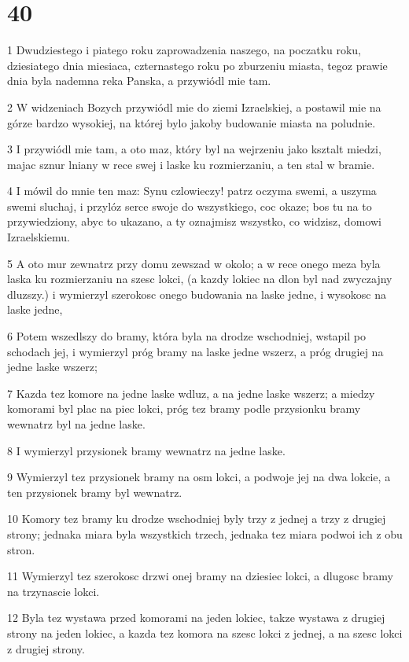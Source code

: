 \chapter{40}

\par 1 Dwudziestego i piatego roku zaprowadzenia naszego, na poczatku roku, dziesiatego dnia miesiaca, czternastego roku po zburzeniu miasta, tegoz prawie dnia byla nademna reka Panska, a przywiódl mie tam.
\par 2 W widzeniach Bozych przywiódl mie do ziemi Izraelskiej, a postawil mie na górze bardzo wysokiej, na której bylo jakoby budowanie miasta na poludnie.
\par 3 I przywiódl mie tam, a oto maz, który byl na wejrzeniu jako ksztalt miedzi, majac sznur lniany w rece swej i laske ku rozmierzaniu, a ten stal w bramie.
\par 4 I mówil do mnie ten maz: Synu czlowieczy! patrz oczyma swemi, a uszyma swemi sluchaj, i przylóz serce swoje do wszystkiego, coc okaze; bos tu na to przywiedziony, abyc to ukazano, a ty oznajmisz wszystko, co widzisz, domowi Izraelskiemu.
\par 5 A oto mur zewnatrz przy domu zewszad w okolo; a w rece onego meza byla laska ku rozmierzaniu na szesc lokci, (a kazdy lokiec na dlon byl nad zwyczajny dluzszy.) i wymierzyl szerokosc onego budowania na laske jedne, i wysokosc na laske jedne,
\par 6 Potem wszedlszy do bramy, która byla na drodze wschodniej, wstapil po schodach jej, i wymierzyl próg bramy na laske jedne wszerz, a próg drugiej na jedne laske wszerz;
\par 7 Kazda tez komore na jedne laske wdluz, a na jedne laske wszerz; a miedzy komorami byl plac na piec lokci, próg tez bramy podle przysionku bramy wewnatrz byl na jedne laske.
\par 8 I wymierzyl przysionek bramy wewnatrz na jedne laske.
\par 9 Wymierzyl tez przysionek bramy na osm lokci, a podwoje jej na dwa lokcie, a ten przysionek bramy byl wewnatrz.
\par 10 Komory tez bramy ku drodze wschodniej byly trzy z jednej a trzy z drugiej strony; jednaka miara byla wszystkich trzech, jednaka tez miara podwoi ich z obu stron.
\par 11 Wymierzyl tez szerokosc drzwi onej bramy na dziesiec lokci, a dlugosc bramy na trzynascie lokci.
\par 12 Byla tez wystawa przed komorami na jeden lokiec, takze wystawa z drugiej strony na jeden lokiec, a kazda tez komora na szesc lokci z jednej, a na szesc lokci z drugiej strony.
